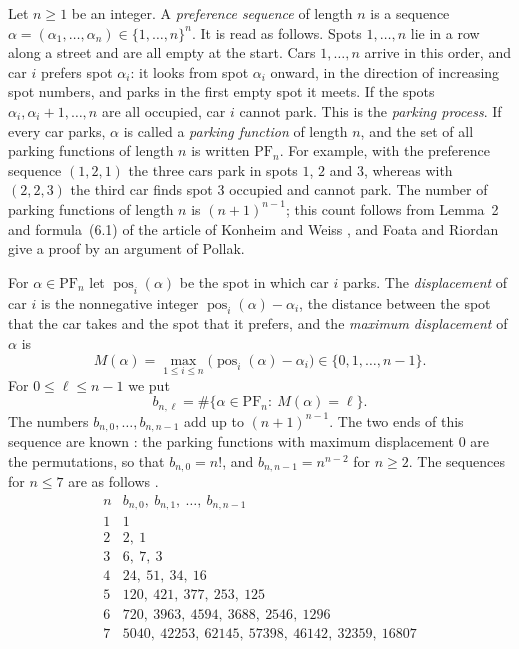 \documentclass{amsart}
\theoremstyle{definition}
\theoremstyle{remark}
\numberwithin{equation}{section}
\begin{document}
Let $n\ge1$ be an integer. A \emph{preference sequence} of length $n$ is a
sequence $\alpha=(\alpha_1,\dots,\alpha_n)\in\{1,\dots,n\}^n$. It is read as
follows. Spots $1,\dots,n$ lie in a row along a street and are all empty at
the start. Cars
$1,\dots,n$ arrive in this order, and car $i$ prefers spot $\alpha_i$: it
looks from spot $\alpha_i$ onward, in the direction of increasing spot
numbers, and parks in the first empty spot it meets. If the spots
$\alpha_i,\alpha_i+1,\dots,n$ are all occupied, car $i$ cannot park. This is
the \emph{parking process}.
If every car parks, $\alpha$ is called a
\emph{parking function} of length $n$, and the set of all parking functions of
length $n$ is written $\mathrm{PF}_n$. For example, with the preference
sequence $(1,2,1)$ the three cars park in spots $1$, $2$ and $3$, whereas
with $(2,2,3)$ the third car finds spot $3$ occupied and cannot park. The
number of parking functions of length $n$ is $(n+1)^{n-1}$; this count
follows from Lemma~2 and formula~(6.1) of the article of Konheim and Weiss
\cite{konheimweiss1966}, and
Foata and Riordan \cite[Section~2]{foatariordan1974} give a proof by an
argument of Pollak.

For $\alpha\in\mathrm{PF}_n$ let $\operatorname{pos}_i(\alpha)$ be the spot in
which car $i$ parks. The \emph{displacement} of car $i$ is the nonnegative
integer $\operatorname{pos}_i(\alpha)-\alpha_i$, the distance between the spot
that the car takes and the spot that it prefers, and the \emph{maximum
displacement} of $\alpha$ is
\[
M(\alpha)=\max_{1\le i\le n}\bigl(\operatorname{pos}_i(\alpha)-\alpha_i\bigr)
\in\{0,1,\dots,n-1\}.
\]
For $0\le\ell\le n-1$ we put
\[
b_{n,\ell}=\#\{\alpha\in\mathrm{PF}_n:\ M(\alpha)=\ell\}.
\]
The numbers $b_{n,0},\dots,b_{n,n-1}$ add up to $(n+1)^{n-1}$. The two ends of
this sequence are known \cite[Example~2.8 and Section~6]{celano2025}: the
parking functions with maximum displacement $0$ are the permutations, so
that $b_{n,0}=n!$, and $b_{n,n-1}=n^{n-2}$ for $n\ge2$. The sequences for
$n\le7$ are as follows \cite[Table~1]{celano2025}.
\begin{equation}\label{eq:intro-rows}
\begin{array}{c|l}
n & b_{n,0},\ b_{n,1},\ \dots,\ b_{n,n-1}\\
\hline
1 & 1\\
2 & 2,\ 1\\
3 & 6,\ 7,\ 3\\
4 & 24,\ 51,\ 34,\ 16\\
5 & 120,\ 421,\ 377,\ 253,\ 125\\
6 & 720,\ 3963,\ 4594,\ 3688,\ 2546,\ 1296\\
7 & 5040,\ 42253,\ 62145,\ 57398,\ 46142,\ 32359,\ 16807
\end{array}
\end{equation}
\end{document}
